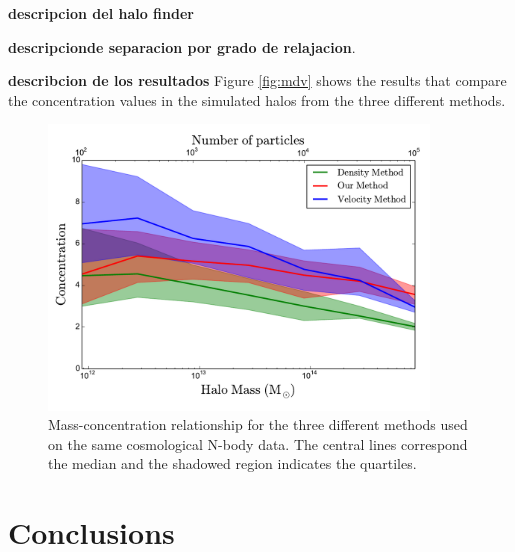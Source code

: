 \documentclass{emulateapj}
\begin{document}
{\bf descripcion del halo finder}

{\bf descripcionde separacion por grado de relajacion}.


{\bf describcion de los resultados}
Figure \ref{fig:mdv} shows the results that compare the concentration
values in the simulated halos from the three different methods.



\begin{figure}
\begin{center}
  \includegraphics[width=0.90\textwidth]{concentration.pdf}
\end{center}
\caption{Mass-concentration relationship for the three different
  methods used on the same cosmological N-body data. The central lines
  correspond the median and the shadowed region indicates the
  quartiles.
    \label{fig:concentration}}
\end{figure}




\section{Conclusions}
\label{sec:conclusions}




\end{document}
